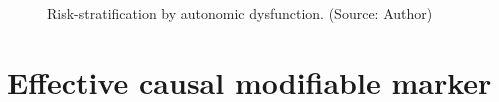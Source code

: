 \documentclass[
  a4paper,
  headsepline=true,
  open=any]{scrbook}
\begin{document}
\begin{figure}

\begin{minipage}[t]{\linewidth}

{\centering 


\caption{Risk-stratification by autonomic dysfunction. (Source: Author)}

}

\end{minipage}%

\end{figure}

\hypertarget{effective-causal-modifiable-marker}{%
\section{Effective causal modifiable
marker}\label{effective-causal-modifiable-marker}}
\end{document}
